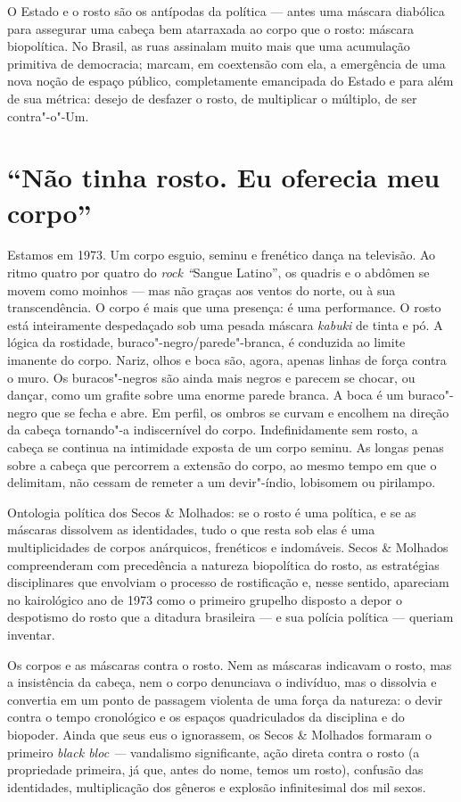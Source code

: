 O Estado e o rosto são os antípodas da política --- antes uma máscara
diabólica para assegurar uma cabeça bem atarraxada ao corpo que o rosto:
máscara biopolítica. No Brasil, as ruas assinalam muito mais que uma
acumulação primitiva de democracia; marcam, em coextensão com ela, a
emergência de uma nova noção de espaço público, completamente emancipada
do Estado e para além de sua métrica: desejo de desfazer o rosto, de
multiplicar o múltiplo, de ser contra"-o"-Um.

\section{``Não tinha rosto. Eu oferecia meu corpo''}

Estamos em 1973. Um corpo esguio, seminu e frenético dança na televisão.
Ao ritmo quatro por quatro do \emph{rock ``}Sangue Latino'', os quadris
e o abdômen se movem como moinhos --- mas não graças aos ventos do norte,
ou à sua transcendência. O corpo é mais que uma presença: é uma
performance. O rosto está inteiramente despedaçado sob uma pesada
máscara \emph{kabuki} de tinta e pó. A lógica da rostidade,
buraco"-negro/parede"-branca, é conduzida ao limite imanente do corpo.
Nariz, olhos e boca são, agora, apenas linhas de força contra o muro. Os
buracos"-negros são ainda mais negros e parecem se chocar, ou dançar,
como um grafite sobre uma enorme parede branca. A boca é um buraco"-negro
que se fecha e abre. Em perfil, os ombros se curvam e encolhem na
direção da cabeça tornando"-a indiscernível do corpo. Indefinidamente sem
rosto, a cabeça se continua na intimidade exposta de um corpo seminu. As
longas penas sobre a cabeça que percorrem a extensão do corpo, ao mesmo
tempo em que o delimitam, não cessam de remeter a um devir"-índio,
lobisomem ou pirilampo.

Ontologia política dos Secos \& Molhados: se o rosto é uma política, e
se as máscaras dissolvem as identidades, tudo o que resta sob elas é uma
multiplicidades de corpos anárquicos, frenéticos e indomáveis. Secos \&
Molhados compreenderam com precedência a natureza biopolítica do rosto,
as estratégias disciplinares que envolviam o processo de rostificação e,
nesse sentido, apareciam no kairológico ano de 1973 como o primeiro
grupelho disposto a depor o despotismo do rosto que a ditadura
brasileira --- e sua polícia política --- queriam inventar.

Os corpos e as máscaras contra o rosto. Nem as máscaras indicavam o
rosto, mas a insistência da cabeça, nem o corpo denunciava o indivíduo,
mas o dissolvia e convertia em um ponto de passagem violenta de uma
força da natureza: o devir contra o tempo cronológico e os espaços
quadriculados da disciplina e do biopoder. Ainda que seus eus o
ignorassem, os Secos \& Molhados formaram o primeiro \emph{black bloc ---}
vandalismo significante, ação direta contra o rosto (a propriedade
primeira, já que, antes do nome, temos um rosto), confusão das
identidades, multiplicação dos gêneros e explosão infinitesimal dos mil
sexos.

